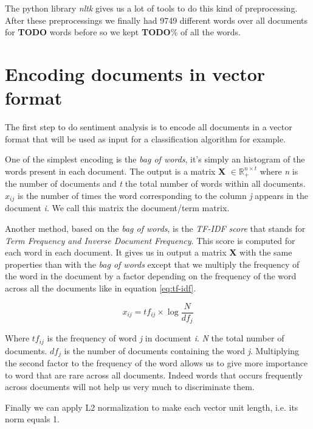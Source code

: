 \documentclass{article}
\begin{document}
The python library \textit{nltk} gives us a lot of tools to do this kind of preprocessing. After these preprocessings we finally had 9749 different words over all documents for \textbf{TODO} words before so we kept \textbf{TODO}\% of all the words.



\section{Encoding documents in vector format}

The first step to do sentiment analysis is to encode all documents in a vector format that will be used as input for a classification algorithm for example. 

One of the simplest encoding is the \textit{bag of words}, it's simply an histogram of the words present in each document. The output is a matrix \textbf{X} $\in \mathbb{R}^{n \times t}_{+}$ where \textit{n} is the number of documents and \textit{t} the total number of words within all documents. $x_{ij}$ is the number of times the word corresponding to the column \textit{j} appears in the document \textit{i}. We call this matrix the document/term matrix.

Another method, based on the \textit{bag of words}, is the \textit{TF-IDF score} that stands for \textit{Term Frequency and Inverse Document Frequency}. This score is computed for each word in each document. It gives us in output a matrix \textbf{X} with the same properties than with the \textit{bag of words} except that we multiply the frequency of the word in the document by a factor depending on the frequency of the word across all the documents like in equation \ref{eq:tf-idf}. 

\begin{equation}
x_{ij} = tf_{ij} \times \log\frac{N}{df_{j}}
\label{eq:tf-idf}
\end{equation}

Where $tf_{ij}$ is the frequency of word \textit{j} in document \textit{i}. \textit{N} the total number of documents. $df_{j}$ is the number of documents containing the word \textit{j}. Multiplying the second factor to the frequency of the word allows us to give more importance to word that are rare across all documents. Indeed words that occurs frequently across documents will not help us very much to discriminate them.

Finally we can apply L2 normalization to make each vector unit length, i.e. its norm equals 1. 
\end{document}
